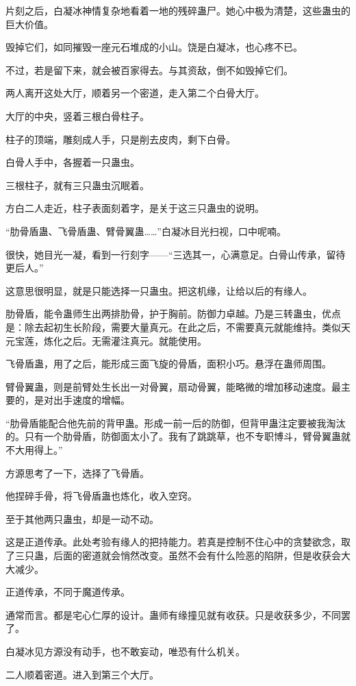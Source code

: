 \begin{this_body}
片刻之后，白凝冰神情复杂地看着一地的残碎蛊尸。她心中极为清楚，这些蛊虫的巨大价值。

毁掉它们，如同摧毁一座元石堆成的小山。饶是白凝冰，也心疼不已。

不过，若是留下来，就会被百家得去。与其资敌，倒不如毁掉它们。

两人离开这处大厅，顺着另一个密道，走入第二个白骨大厅。

大厅的中央，竖着三根白骨柱子。

柱子的顶端，雕刻成人手，只是削去皮肉，剩下白骨。

白骨人手中，各握着一只蛊虫。

三根柱子，就有三只蛊虫沉眠着。

方白二人走近，柱子表面刻着字，是关于这三只蛊虫的说明。

“肋骨盾蛊、飞骨盾蛊、臂骨翼蛊……”白凝冰目光扫视，口中呢喃。

很快，她目光一凝，看到一行刻字——“三选其一，心满意足。白骨山传承，留待更后人。”

这意思很明显，就是只能选择一只蛊虫。把这机缘，让给以后的有缘人。

肋骨盾，能令蛊师生出两排肋骨，护于胸前。防御力卓越。乃是三转蛊虫，优点是：除去起初生长阶段，需要大量真元。在此之后，不需要真元就能维持。类似天元宝莲，炼化之后。无需灌注真元。就能使用。

飞骨盾蛊，用了之后，能形成三面飞旋的骨盾，面积小巧。悬浮在蛊师周围。

臂骨翼蛊，则是前臂处生长出一对骨翼，扇动骨翼，能略微的增加移动速度。最主要的，是对出手速度的增幅。

“肋骨盾能配合他先前的背甲蛊。形成一前一后的防御，但背甲蛊注定要被我淘汰的。只有一个肋骨盾，防御面太小了。我有了跳跳草，也不专职博斗，臂骨翼蛊就不大用得上。”

方源思考了一下，选择了飞骨盾。

他捏碎手骨，将飞骨盾蛊也炼化，收入空窍。

至于其他两只蛊虫，却是一动不动。

这是正道传承。此处考验有缘人的把持能力。若真是控制不住心中的贪婪欲念，取了三只蛊，后面的密道就会悄然改变。虽然不会有什么险恶的陷阱，但是收获会大大减少。

正道传承，不同于魔道传承。

通常而言。都是宅心仁厚的设计。蛊师有缘撞见就有收获。只是收获多少，不同罢了。

白凝冰见方源没有动手，也不敢妄动，唯恐有什么机关。

二人顺着密道。进入到第三个大厅。


\end{this_body}
